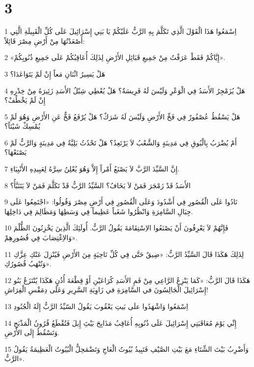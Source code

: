 \chapter{3}

\par 1 اِسْمَعُوا هَذَا الْقَوْلَ الَّذِي تَكَلَّمَ بِهِ الرَّبُّ عَلَيْكُمْ يَا بَنِي إِسْرَائِيلَ عَلَى كُلِّ الْقَبِيلَةِ الَّتِي أَصْعَدْتُهَا مِنْ أَرْضِ مِصْرَ قَائِلاً:
\par 2 «إِيَّاكُمْ فَقَطْ عَرَفْتُ مِنْ جَمِيعِ قَبَائِلِ الأَرْضِ لِذَلِكَ أُعَاقِبُكُمْ عَلَى جَمِيعِ ذُنُوبِكُمْ».
\par 3 هَلْ يَسِيرُ اثْنَانِ مَعاً إِنْ لَمْ يَتَوَاعَدَا؟
\par 4 هَلْ يُزَمْجِرُ الأَسَدُ فِي الْوَعْرِ وَلَيْسَ لَهُ فَرِيسَةٌ؟ هَلْ يُعْطِي شِبْلُ الأَسَدِ زَئِيرَهُ مِنْ خِدْرِهِ إِنْ لَمْ يَخْطُفْ؟
\par 5 هَلْ يَسْقُطُ عُصْفُورٌ فِي فَخِّ الأَرْضِ وَلَيْسَ لَهُ شَرَكٌ؟ هَلْ يُرْفَعُ فَخٌّ عَنِ الأَرْضِ وَهُوَ لَمْ يُمْسِكْ شَيْئاً؟
\par 6 أَمْ يُضْرَبُ بِالْبُوقِ فِي مَدِينَةٍ وَالشَّعْبُ لاَ يَرْتَعِدُ؟ هَلْ تَحْدُثُ بَلِيَّةٌ فِي مَدِينَةٍ وَالرَّبُّ لَمْ يَصْنَعْهَا؟
\par 7 إِنَّ السَّيِّدَ الرَّبَّ لاَ يَصْنَعُ أَمْراً إِلاَّ وَهُوَ يُعْلِنُ سِرَّهُ لِعَبِيدِهِ الأَنْبِيَاءِ.
\par 8 الأَسَدُ قَدْ زَمْجَرَ فَمَنْ لاَ يَخَافُ؟ السَّيِّدُ الرَّبُّ قَدْ تَكَلَّمَ فَمَنْ لاَ يَتَنَبَّأُ؟
\par 9 نَادُوا عَلَى الْقُصُورِ فِي أَشْدُودَ وَعَلَى الْقُصُورِ فِي أَرْضِ مِصْرَ وَقُولُوا: «اجْتَمِعُوا عَلَى جِبَالِ السَّامِرَةِ وَانْظُرُوا شَغَباً عَظِيماً فِي وَسَطِهَا وَمَظَالِمَ فِي دَاخِلِهَا.
\par 10 فَإِنَّهُمْ لاَ يَعْرِفُونَ أَنْ يَصْنَعُوا الاِسْتِقَامَةَ يَقُولُ الرَّبُّ. أُولَئِكَ الَّذِينَ يَخْزِنُونَ الظُّلْمَ وَالاِغْتِصَابَ فِي قُصُورِهِمْ».
\par 11 لِذَلِكَ هَكَذَا قَالَ السَّيِّدُ الرَّبُّ: «ضِيقٌ حَتَّى فِي كُلِّ نَاحِيَةٍ مِنَ الأَرْضِ فَيُنْزِلَ عَنْكِ عِزَّكِ وَتُنْهَبُ قُصُورُكِ».
\par 12 هَكَذَا قَالَ الرَّبُّ: «كَمَا يَنْزِعُ الرَّاعِي مِنْ فَمِ الأَسَدِ كُرَاعَيْنِ أَوْ قِطْعَةَ أُذُنٍ هَكَذَا يُنْتَزَعُ بَنُو إِسْرَائِيلَ الْجَالِسُونَ في السَّامِرَةِ في زَاوِيَةِ السَّرِيرِ وَعَلَى دِمَقْسِ الْفِرَاشِ!
\par 13 اِسْمَعُوا وَاشْهَدُوا علَى بَيتِ يَعْقُوبَ يَقُولُ السّيِّدُ الرَّبُّ إِلَهُ الْجُنُودِ
\par 14 إِنِّي يَوْمَ مُعَاقَبَتِي إِسْرَائِيلَ عَلَى ذُنُوبِهِ أُعَاقِبُ مَذَابِحَ بَيْتَِ إِيلَ فَتُقْطَعُ قُرُونُ الْمَذْبَحِ وَتَسْقُطُ إِلَى الأَرْضِ.
\par 15 وَأَضْرِبُ بَيْتَ الشِّتَاءِ مَعَ بَيْتِ الصَّيْفِ فَتَبِيدُ بُيُوتُ الْعَاجِ وَتَضْمَحِلُّ الْبُيُوتُ الْعَظِيمَةُ يَقُولُ الرَّبُّ».

